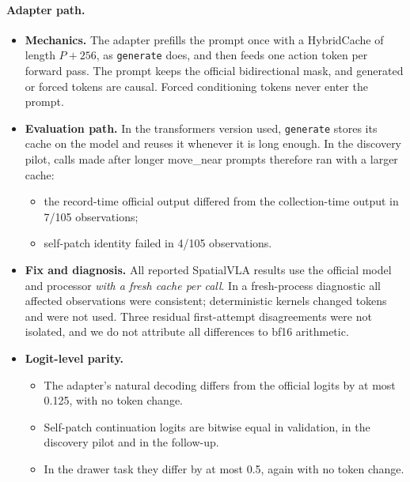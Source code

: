 \paragraph{Adapter path.}
\begin{itemize}
\item \textbf{Mechanics.} The adapter prefills the prompt once with a HybridCache of length $P{+}256$, as \texttt{generate} does, and then feeds one action token per forward pass. The prompt keeps the official bidirectional mask, and generated or forced tokens are causal. Forced conditioning tokens never enter the prompt.
\item \textbf{Evaluation path.} In the transformers version used, \texttt{generate} stores its cache on the model and reuses it whenever it is long enough. In the discovery pilot, calls made after longer move\_near prompts therefore ran with a larger cache:
  \begin{itemize}
  \item the record-time official output differed from the collection-time output in 7/105 observations;
  \item self-patch identity failed in 4/105 observations.
  \end{itemize}
\item \textbf{Fix and diagnosis.} All reported SpatialVLA results use the official model and processor \emph{with a fresh cache per call}. In a fresh-process diagnostic all affected observations were consistent; deterministic kernels changed tokens and were not used. Three residual first-attempt disagreements were not isolated, and we do not attribute all differences to bf16 arithmetic.
\item \textbf{Logit-level parity.}
  \begin{itemize}
  \item The adapter's natural decoding differs from the official logits by at most 0.125, with no token change.
  \item Self-patch continuation logits are bitwise equal in validation, in the discovery pilot and in the follow-up.
  \item In the drawer task they differ by at most 0.5, again with no token change.
  \end{itemize}
\end{itemize}

